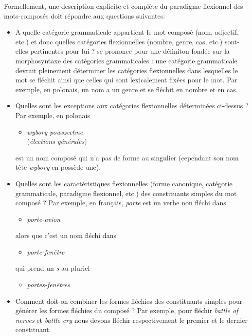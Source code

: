 \bigskip
\noindent Formellement, une description explicite et complète du paradigme flexionnel des mots-composés doit répondre aux questions suivantes:

\begin{itemize}
\item A quelle catégorie grammaticale appartient le mot composé (nom, adjectif, etc.) et donc
quelles catégories flexionnelles (nombre, genre, cas, etc.) sont-elles pertinentes pour lui ?
\cite{PrzepWol03} se prononce pour une définiton fondée sur la morphosyntaxe des catégories
grammaticales : une catégorie grammaticale devrait pleinement déterminer les catégories
flexionnelles dans lesquelles le mot se fléchit ainsi que celles qui sont lexicalement fixées pour le
mot. Par exemple, en polonais, un nom a un genre et se fléchit en nombre et en cas.
\item Quelles sont les exceptions aux catégories flexionnelles déterminées ci-dessus ? Par exemple,
en polonais 

\begin{itemize}
\item \emph{wybory powszechne}\\
	(\emph{élections générales}) 
\end{itemize}

est un nom composé qui n'a pas de forme au singulier (cependant son nom tête \emph{wybory} en
	possède une).

\item Quelles sont les caractéristiques flexionnelles (forme canonique, catégorie grammaticale,
paradigme flexionnel, etc.) des constituants simples du mot composé ? Par exemple, en français,
\emph{porte} est un verbe non fléchi dans  

\begin{itemize}
\item \emph{porte-avion}
\end{itemize}

alors que c'est un nom fléchi dans
 
\begin{itemize}
\item \emph{porte-fenêtre}
\end{itemize}

qui prend un \emph{s} au pluriel

\begin{itemize}
\item \emph{porte\underline{s}-fenêtre\underline{s}}
\end{itemize}

\item Comment doit-on combiner les formes fléchies des constituants simples pour générer les formes fléchies du composé ? Par exemple, pour fléchir \emph{battle of nerves} et \emph{battle cry} nous devons fléchir respectivement le premier et le dernier constituant. 
\end{itemize}

